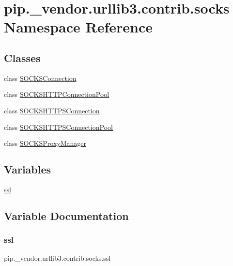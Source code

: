 \hypertarget{namespacepip_1_1__vendor_1_1urllib3_1_1contrib_1_1socks}{}\section{pip.\+\_\+vendor.\+urllib3.\+contrib.\+socks Namespace Reference}
\label{namespacepip_1_1__vendor_1_1urllib3_1_1contrib_1_1socks}
\subsection*{Classes}
\begin{DoxyCompactItemize}
\item 
class \hyperlink{classpip_1_1__vendor_1_1urllib3_1_1contrib_1_1socks_1_1SOCKSConnection}{S\+O\+C\+K\+S\+Connection}
\item 
class \hyperlink{classpip_1_1__vendor_1_1urllib3_1_1contrib_1_1socks_1_1SOCKSHTTPConnectionPool}{S\+O\+C\+K\+S\+H\+T\+T\+P\+Connection\+Pool}
\item 
class \hyperlink{classpip_1_1__vendor_1_1urllib3_1_1contrib_1_1socks_1_1SOCKSHTTPSConnection}{S\+O\+C\+K\+S\+H\+T\+T\+P\+S\+Connection}
\item 
class \hyperlink{classpip_1_1__vendor_1_1urllib3_1_1contrib_1_1socks_1_1SOCKSHTTPSConnectionPool}{S\+O\+C\+K\+S\+H\+T\+T\+P\+S\+Connection\+Pool}
\item 
class \hyperlink{classpip_1_1__vendor_1_1urllib3_1_1contrib_1_1socks_1_1SOCKSProxyManager}{S\+O\+C\+K\+S\+Proxy\+Manager}
\end{DoxyCompactItemize}
\subsection*{Variables}
\begin{DoxyCompactItemize}
\item 
\hyperlink{namespacepip_1_1__vendor_1_1urllib3_1_1contrib_1_1socks_ae213fa4600ecc1ebe2edf3cab6f2d838}{ssl}
\end{DoxyCompactItemize}


\subsection{Variable Documentation}
\mbox{\label{namespacepip_1_1__vendor_1_1urllib3_1_1contrib_1_1socks_ae213fa4600ecc1ebe2edf3cab6f2d838}} 
\subsubsection{\texorpdfstring{ssl}{ssl}}
{\footnotesize\ttfamily pip.\+\_\+vendor.\+urllib3.\+contrib.\+socks.\+ssl}

